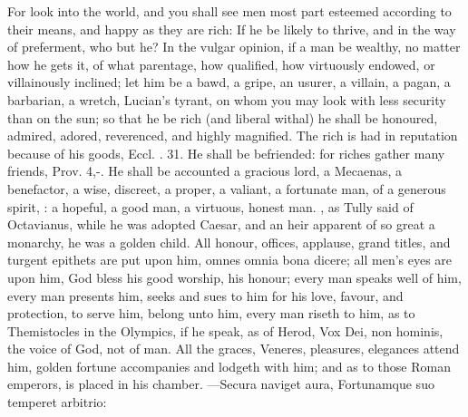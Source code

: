 {For look into the world, and you shall see men most part esteemed
according to their means, and happy as they are rich:  If he be likely to thrive, and in
the way of preferment, who but he? In the vulgar opinion, if a man be
wealthy, no matter how he gets it, of what parentage, how qualified,
how virtuously endowed, or villainously inclined; let him be a bawd, a
gripe, an usurer, a villain, a pagan, a barbarian, a wretch,
Lucian's tyrant, on whom you may look with less security than on
the sun; so that he be rich (and liberal withal) he shall be honoured,
admired, adored, reverenced, and highly magnified. The rich is
had in reputation because of his goods, Eccl. . 31. He shall be
befriended: for riches gather many friends, Prov.  4,-. He
shall be accounted a gracious lord, a Mecaenas, a benefactor, a wise,
discreet, a proper, a valiant, a fortunate man, of a generous spirit,
: a hopeful, a good man, a
virtuous, honest man. , as Tully said of Octavianus, while he was adopted
Caesar, and an heir apparent of so great a monarchy, he was a
golden child. All honour, offices, applause, grand titles, and
turgent epithets are put upon him, omnes omnia bona dicere; all men's
eyes are upon him, God bless his good worship, his honour; every
man speaks well of him, every man presents him, seeks and sues to him
for his love, favour, and protection, to serve him, belong unto him,
every man riseth to him, as to Themistocles in the Olympics, if he
speak, as of Herod, Vox Dei, non hominis, the voice of God, not of man.
All the graces, Veneres, pleasures, elegances attend him,  golden
fortune accompanies and lodgeth with him; and as to those Roman
emperors, is placed in his chamber.
---Secura naviget aura,
Fortunamque suo temperet arbitrio:

}
